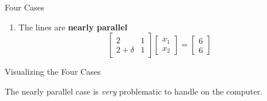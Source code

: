 \documentclass[10pt]{beamer}
\begin{document}
\begin{frame}{Four Cases}
\begin{enumerate}
\item The lines are \textbf{nearly parallel}
\begin{equation*}
    \begin{bmatrix} 2 & 1 \\ 2+\delta & 1 \end{bmatrix}
    \begin{bmatrix} x_1 \\ x_2 \end{bmatrix}
    =
    \begin{bmatrix} 6 \\ 6 \end{bmatrix}
\end{equation*}
\end{enumerate}

\end{frame}

\begin{frame}{Visualizing the Four Cases }

\begin{center}

    The nearly parallel case is \textit{very} problematic to handle on the computer.
\end{center}
\end{frame}
\end{document}
